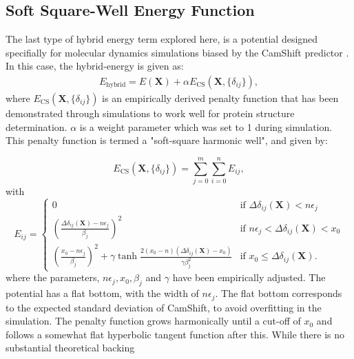 \subsection{Soft Square-Well Energy Function}
The last type of hybrid energy term explored here, is a potential designed specifially for molecular dynamics simulations biased by the CamShift predictor \cite{robustelli2009, CSMD}.
In this case, the hybrid-energy is given as:
\begin{eqnarray}
    E_{\mathrm{hybrid}}
    = E(\mathbf X) + \alpha E_{\mathrm{CS}}(\mathbf X, \{\delta_{ij}\}),
\end{eqnarray}
where $E_{\mathrm{CS}}(\mathbf X, \{\delta_{ij}\})$ is an empirically derived penalty function that has been demonstrated through simulations to work well for protein structure determination.
$\alpha$ is a weight parameter which was set to 1 during simulation.
This penalty function is termed a "soft-square harmonic well", and given by:


\begin{equation}
    E_{\mathrm{CS}}(\mathbf X, \{\delta_{ij}\}) = \sum_{j=0}^{m} \sum_{i=0}^{n} E_{ij},
\end{equation}
with 
\begin{equation}
    E_{ij} = \begin{cases} 
        0
                & \mbox{if }  \Delta\delta_{ij}(\mathbf X) < n\epsilon_j\\ 
        \left( \frac{\Delta\delta_{ij}(\mathbf X) - n \epsilon_j}{\beta_j}\right)^2
                & \mbox{if }  n\epsilon_j < \Delta\delta_{ij}(\mathbf X) < x_0 \\ 
        \left( \frac{x_0- n \epsilon_j}{\beta_j}\right)^2 + \gamma \tanh{
            \frac{2(x_0- n)(\Delta\delta_{ij}(\mathbf X) - x_0)}{\gamma\beta_j^2}
        }
                & \mbox{if }  x_0 \leq \Delta\delta_{ij}(\mathbf X) .
    \end{cases}
\end{equation}
where the parameters, $n\epsilon_j, x_0, \beta_j$ and $\gamma$ have been empirically adjusted.
The potential has a flat bottom, with the width of $n\epsilon_j$.
The flat bottom corresponds to the expected standard deviation of CamShift, to avoid overfitting in the simulation.
The penalty function grows harmonically until a cut-off of $x_0$ and follows a somewhat flat hyperbolic tangent function after this.
While there is no substantial theoretical backing







